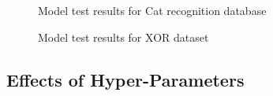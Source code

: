 \documentclass[./project-report/src/latex/project-report.tex]{subfiles}
\begin{document}
\pagebreak

\begin{figure}[h!]
\centering
{}
\caption{Model test results for Cat recognition database}
\end{figure}

\pagebreak

\begin{figure}[h!]
\centering
{}
\caption{Model test results for XOR dataset}
\end{figure}

\subsection{Effects of Hyper-Parameters}
\label{sec:effects-of-hyper-parameters}
\end{document}
